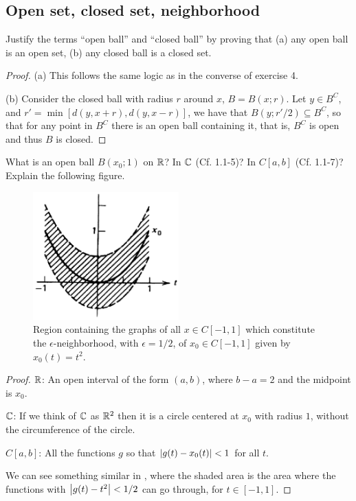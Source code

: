\subsection{Open set, closed set, neighborhood}


\begin{exercise}{1}
Justify the terms ``open ball'' and ``closed ball'' by proving that (a) any open ball is an open set, (b) any closed ball is a closed set.
\end{exercise}
\begin{proof}
(a) This follows the same logic as in the converse of exercise 4.

(b) Consider the closed ball with radius $r$ around $x$, $B=B(x;r)$. Let $y\in B^C$, and $r'=\min[d(y,x+r), d(y,x-r)]$, we have that $B(y;r'/2)\subseteq B^C$, so that for any point in $B^C$ there is an open ball containing it, that is, $B^C$ is open and thus $B$ is closed.
\end{proof}

\begin{exercise}{2}
What is an open ball $B(x_0; 1)$ on $\mathbb{R}$? In $\mathbb{C}$ (Cf. 1.1-5)?  In $C[a,b]$ (Cf. 1.1-7)? Explain the following figure.
\begin{figure}[H]
    \centering
    \includegraphics[width=0.5\textwidth]{kreyszig/assets/sec1-3-ex2.png}
    \caption{Region containing the graphs of all $x\in C[-1,1]$ which constitute the $\epsilon$-neighborhood, with $\epsilon=1/2$, of $x_0\in C[-1,1]$ given by $x_0(t)=t^2$.}
    \label{fig:fig1-3}
\end{figure}
\end{exercise}
\begin{proof}
$\mathbb{R}$: An open interval of the form $(a,b)$, where $b-a=2$ and the midpoint is $x_0$.

$\mathbb{C}$: If we think of $\mathbb{C}$ as $\mathbb{R}^2$ then it is a circle centered at $x_0$ with radius $1$, without the circumference of the circle.

$C[a,b]$: All the functions $g$ so that $\left\lvert g(t)-x_0(t)\right\rvert<1$ for all $t$. 

We can see something similar in , where the shaded area is the area where the functions with $\left\lvert g(t)-t^2\right\rvert<1/2$ can go through, for $t\in[-1,1]$.
\end{proof}

